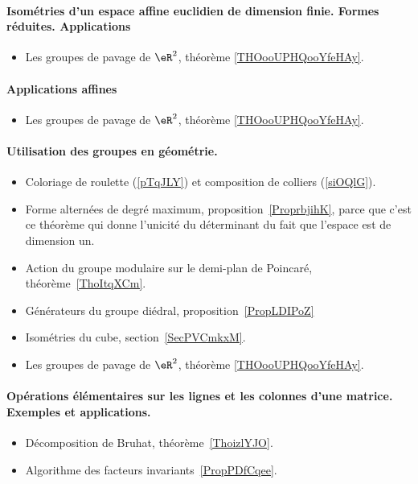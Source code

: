 \paragraph{Isométries d'un espace affine euclidien de dimension finie. Formes réduites. Applications}
\begin{itemize}
    \item Les groupes de pavage de \( \eR^2\), théorème \ref{THOooUPHQooYfeHAy}.
\end{itemize}
\paragraph{Applications affines}
\begin{itemize}
    \item Les groupes de pavage de \( \eR^2\), théorème \ref{THOooUPHQooYfeHAy}.
\end{itemize}
\paragraph{Utilisation des groupes en géométrie.}
\begin{itemize}
    \item Coloriage de roulette (\ref{pTqJLY}) et composition de colliers (\ref{siOQlG}).
    \item Forme alternées de degré maximum, proposition~\ref{ProprbjihK}, parce que c'est ce théorème qui donne l'unicité du déterminant du fait que l'espace est de dimension un.
    \item Action du groupe modulaire sur le demi-plan de Poincaré, théorème~\ref{ThoItqXCm}.
    \item Générateurs du groupe diédral, proposition~\ref{PropLDIPoZ}
    \item Isométries du cube, section~\ref{SecPVCmkxM}.
    \item Les groupes de pavage de \( \eR^2\), théorème \ref{THOooUPHQooYfeHAy}.
\end{itemize}


\paragraph{Opérations élémentaires sur les lignes et les colonnes d’une matrice. Exemples et applications.}
\begin{itemize}
    \item Décomposition de Bruhat, théorème~\ref{ThoizlYJO}.
    \item Algorithme des facteurs invariants~\ref{PropPDfCqee}.
\end{itemize}

